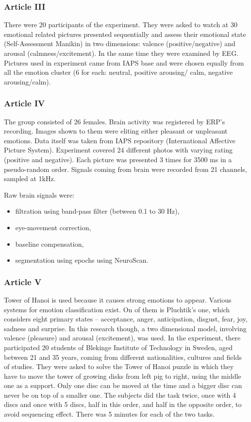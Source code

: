 \documentclass[10pt,journal,compsoc]{IEEEtran}
\begin{document}
\subsubsection*{Article III}
There were 20 participants of the experiment. They were asked to watch at 30 emotional related pictures presented sequentially and assess their emotional state (Self-Assessment Manikin) in two dimensions: valence (positive/negative) and arousal (calmness/excitement). In the same time they were examined by EEG. Pictures used in experiment came from IAPS base and were chosen equally from all the emotion cluster (6 for each: neutral, positive arousing/ calm, negative arousing/calm).

\subsubsection*{Article IV}
The group consisted of 26 females. Brain activity was registered by ERP’s recording. Images shown to them were eliting either pleasant or unpleasant emotions. Data itself was taken from IAPS repository (International Affective Picture System). Experiment covered 24 different photos with varying rating (positive and negative). Each picture was presented 3 times for 3500 ms in a pseudo-random order. Signals coming from brain were recorded from 21 channels, sampled at 1kHz.

Raw brain signals were:
\begin{itemize}
\item{filtration using band-pass filter (between 0.1 to 30 Hz),}
\item{eye-movement correction,}
\item{baseline compensation,}
\item{segmentation using epochs using NeuroScan.}
\end{itemize}

\subsubsection*{Article V}
Tower of Hanoi is used because it causes strong emotions to appear. Various systems for emotion classification exist. On of them is Pluchtik’s one, which considers eight primary states – acceptance, anger, anticipation, disgust, fear, joy, sadness and surprise. In this research though, a two dimensional model, involving valence (pleasure) and arousal (excitement), was used. In the experiment, there participated 20 students of Blekinge Institute of Technology in Sweden, aged between 21 and 35 years, coming from different nationalities, cultures and fields of studies. They were asked to solve the Tower of Hanoi puzzle in which they have to move the tower of growing disks from left pig to right, using the middle one as a support. Only one disc can be moved at the time and a bigger disc can never be on top of a smaller one. The subjects did the task twice, once with 4 discs and once with 5 discs, half in this order, and half in the opposite order, to avoid sequencing effect. There was 5 minutes for each of the two tasks.
\end{document}
